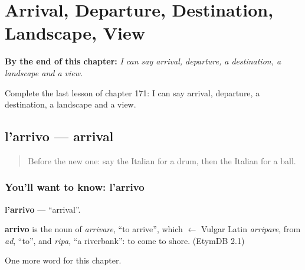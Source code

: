 
\chapter{Arrival, Departure, Destination, Landscape, View}
\label{ch:it-arrival-departure-destination-landscape-view}

\begin{chapteropening}
\textbf{By the end of this chapter:} \emph{I can say arrival, departure, a destination, a landscape and a view.}

Complete the last lesson of chapter 171: I can say arrival, departure, a destination, a landscape and a view.
\end{chapteropening}

\section[l'arrivo]{l'arrivo — arrival}

\label{lesson:IT-C171-arrivo}



\begin{quote}
Before the new one: say the Italian for a drum, then the Italian for a ball.
\end{quote}

\subsection*{You'll want to know: l'arrivo}
\textbf{l'arrivo} — \textquotedblleft{}arrival\textquotedblright{}.

\begin{cousinweb}
\textbf{arrivo} is the noun of \emph{arrivare}, \textquotedblleft{}to arrive\textquotedblright{}, which $\leftarrow$ Vulgar Latin \emph{arripare}, from \emph{ad}, \textquotedblleft{}to\textquotedblright{}, and \emph{ripa}, \textquotedblleft{}a riverbank\textquotedblright{}: to come to shore. (EtymDB 2.1)
\end{cousinweb}

\begin{grammarlens}[title={What you've built}]
One more word for this chapter.
\end{grammarlens}

